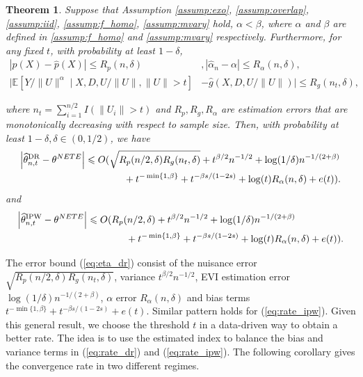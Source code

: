 \documentclass[12pt]{article}
\theoremstyle{plain}
\newtheorem{theorem}{Theorem}[section]
\theoremstyle{definition}
\begin{document}
\begin{theorem}
  \label{thm:rate}Suppose that Assumption
  \ref{assump:exo}, \ref{assump:overlap}, \ref{assump:iid}, \ref{assump:f_homo}, \ref{assump:mvary} hold, $\alpha < \beta$, where $\alpha$
  and $\beta$ are defined in \cref{assump:f_homo} and \cref{assump:mvary}
  respectively. Furthermore, for any fixed $t$, with probability at least $1 -
  \delta$,
  \begin{align*}
    |p (X) - \hat{p} (X) | \leqslant R_p (n, \delta) & ,  | \hat{\alpha}_{n} - \alpha| \leqslant R_\alpha(n,\delta),\\
    |\mathbb{E}[Y/\|U\|^{\alpha} \mid X, D, U /\|U\|, \|U\|> t] &- \hat{g} (X, D, U /\|U\|)
    | \leqslant R_g (n_t, \delta),
  \end{align*}
  
  where $n_t = \sum_{i = 1}^{n/2} I (\|U_i \|> t)$ and $R_p, R_g, R_\alpha$ are estimation
  errors that are monotonically decreasing with respect to sample size. Then, with probability at
  least $1 - \delta, \delta \in (0, 1 / 2)$, we have
  \begin{align}
    \left| {{\widehat{\theta }_{n, t}^{\text{DR} }} }   -
    \theta^{NETE} \right|  & \leqslant O (\sqrt{R_p (n/2, \delta)R_g ({n_t}, \delta)} + t^{\beta / 2} n^{-1 / 2}+ \log (1 / \delta) n^{- 1 / (2 +\beta)}  \notag\\
    & \quad\quad \quad \quad + t^{- \min \{1, \beta\}}  + t^{- \beta s / (1 - 2 s)} + \log(t)R_\alpha(n,\delta)+ e (t)).\label{eq:rate_dr} 
  \end{align}
  and
  \begin{align}
    \left| {{\widehat{\theta }_{n, t}^{\text{IPW}}} }   - \theta^{NETE}
    \right| & \leqslant O (R_p (n/2, \delta)  +t^{\beta / 2} n^{- 1 / 2} + \log (1 / \delta)
    n^{- 1 / (2 + \beta)} \notag\\
    &\quad\quad \quad \quad  + t^{- \min \{1, \beta\}} + t^{- \beta s / (1 - 2 s)}+ \log(t)R_\alpha(n,\delta) + e (t)). \label{eq:rate_ipw}
  \end{align}
\end{theorem} 

The error bound (\ref{eq:eta_dr}) consist of the nuisance error $ \sqrt{R_p (n/2, \delta)R_g ({n_t}, \delta)}$, variance $ t^{\beta / 2} n^{-1 / 2} $, EVI estimation error $ \log (1 / \delta) n^{- 1 / (2 +\beta)} $, $\alpha$ error $ R_\alpha (n,\delta)$ and bias terms $ t^{- \min \{1, \beta\}}  + t^{- \beta s / (1 - 2 s)} +  e (t) $. Similar pattern holds for (\ref{eq:rate_ipw}). Given this general result, we choose the threshold $t$ in a data-driven way to obtain a better rate. The idea is to use the estimated index to balance
the bias and variance terms in (\ref{eq:rate_dr}) and (\ref{eq:rate_ipw}). The following corollary gives
the convergence rate in two different regimes.
\end{document}
